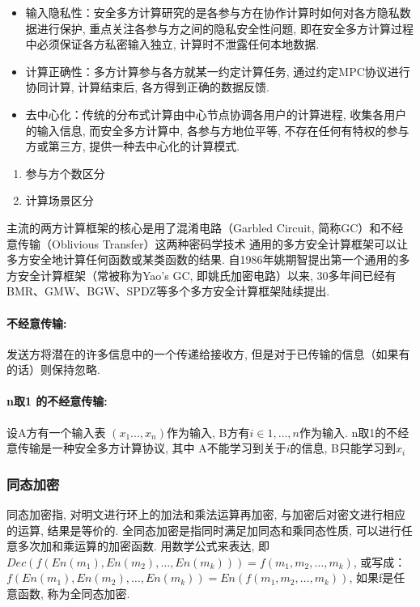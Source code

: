 \documentclass[a4paper]{article}
\theoremstyle{definition}
\numberwithin{equation}{section}
\begin{document}
\begin{itemize}
    \item  输入隐私性：安全多方计算研究的是各参与方在协作计算时如何对各方隐私数据进行保护, 重点关注各参与方之间的隐私安全性问题, 即在安全多方计算过程中必须保证各方私密输入独立, 计算时不泄露任何本地数据. 
\item    计算正确性：多方计算参与各方就某一约定计算任务, 通过约定MPC协议进行协同计算, 计算结束后, 各方得到正确的数据反馈. 
    \item     去中心化：传统的分布式计算由中心节点协调各用户的计算进程, 收集各用户的输入信息, 而安全多方计算中, 各参与方地位平等, 不存在任何有特权的参与方或第三方, 提供一种去中心化的计算模式. 
\end{itemize}

\begin{enumerate}
    \item 参与方个数区分
    \item 计算场景区分
\end{enumerate}

主流的两方计算框架的核心是用了混淆电路（Garbled Circuit, 简称GC）和不经意传输（Oblivious Transfer）这两种密码学技术
通用的多方安全计算框架可以让多方安全地计算任何函数或某类函数的结果. 自1986年姚期智提出第一个通用的多方安全计算框架（常被称为Yao’s GC, 即姚氏加密电路）以来, 30多年间已经有BMR、GMW、BGW、SPDZ等多个多方安全计算框架陆续提出. 
\citep{GenExchsecretyao1986}
\paragraph{不经意传输:}
发送方将潜在的许多信息中的一个传递给接收方, 但是对于已传输的信息（如果有的话）则保持忽略. 


\paragraph{n取1 的不经意传输:}设A方有一个输入表 $(x_1..., x_n)$作为输入, 
B方有$i \in 1,  \dots , n$作为输入. n取1的不经意传输是一种安全多方计算协议, 其中
A不能学习到关于$i$的信息, B只能学习到$x_i$
\subsubsection{同态加密}
同态加密指, 对明文进行环上的加法和乘法运算再加密, 与加密后对密文进行相应的运算, 结果是等价的. 
全同态加密是指同时满足加同态和乘同态性质, 可以进行任意多次加和乘运算的加密函数. 用数学公式来表达, 即$Dec(f(En(m_1), En(m_2), …, En(m_k)))=f(m_1, m_2, …, m_k)$, 或写成：$f(En(m_1), En(m_2), …, En(m_k))=En(f(m_1, m_2, …, m_k))$, 如果f是任意函数, 称为全同态加密. 
\end{document}
